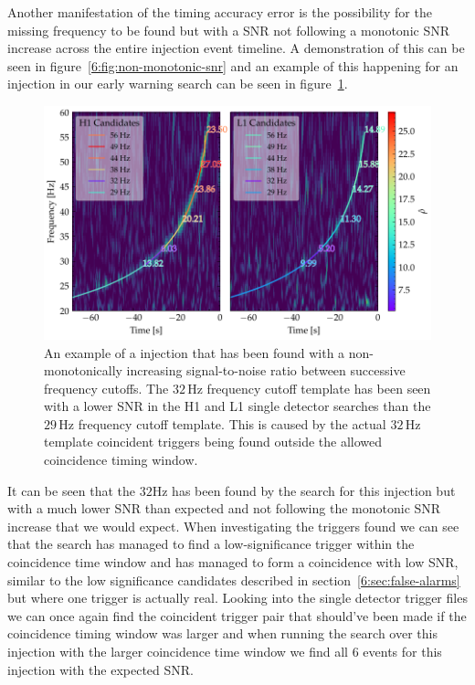 Another manifestation of the timing accuracy error is the possibility for the missing frequency to be found but with a SNR not following a monotonic SNR increase across the entire injection event timeline. A demonstration of this can be seen in figure~\ref{6:fig:non-monotonic-snr} and an example of this happening for an injection in our early warning search can be seen in figure~\ref{6:fig:non_mono_eg}.
%
\begin{figure}
    \centering
    \includegraphics[width=1.0\linewidth]{images/6_earlywarning/stories/non_mono_example.pdf}
    \caption{An example of a \gwadj injection that has been found with a non-monotonically increasing signal-to-noise ratio between successive frequency cutoffs. The $32 \, \text{Hz}$ frequency cutoff \gwadj template has been seen with a lower SNR in the H1 and L1 single detector searches than the $29 \, \text{Hz}$ frequency cutoff template. This is caused by the actual $32 \, \text{Hz}$ template coincident triggers being found outside the allowed coincidence timing window.}
    \label{6:fig:non_mono_eg}
\end{figure}

It can be seen that the $32$Hz has been found by the search for this injection but with a much lower SNR than expected and not following the monotonic SNR increase that we would expect. When investigating the triggers found we can see that the search has managed to find a low-significance trigger within the coincidence time window and has managed to form a coincidence with low SNR, similar to the low significance candidates described in section~\ref{6:sec:false-alarms} but where one trigger is actually real. Looking into the single detector trigger files we can once again find the coincident trigger pair that should've been made if the coincidence timing window was larger and when running the search over this injection with the larger coincidence time window we find all $6$ events for this injection with the expected SNR.

